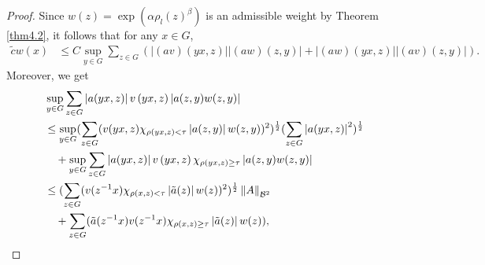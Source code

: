 \documentclass[preprint,11pt]{elsarticle}
\numberwithin{equation}{section}
\begin{document}
\begin{proof}
		\noindent Since $w(z)=\exp(\alpha \rho_{l }(z)^{\beta})$ is an admissible weight by Theorem \ref{thm4.2}, it follows that for any $x\in G$,
		\begin{align}
			\label{6.10}
			\tilde{c}w(x) &\le C\sup_{y\in G}\sum _{z\in G}(\left | (av)(yx,z) \right | \left | (aw) (z,y)\right |+\left | (aw)(yx,z) \right | \left | (av) (z,y)\right |).
		\end{align}
		Moreover, we get
		\begin{align}\label{norm}
			&\sup_{y\in G}\sum _{z\in G}\left | a(yx,z) \right | v\left ( yx,z \right )\left | a(z,y) w(z,y)\right |\notag\\
			&\leq\sup_{y\in G}(\sum _{z\in G}(v(yx,z)\chi _{\rho (yx,z)<\tau }\left | a(z,y) \right | w(z,y))^2 )^\frac{1}{2}  ( \sum _{z\in G} \left | a(yx,z) \right |^2 )^\frac{1}{2} \notag\\
			&\quad+\sup_{y\in G}\sum _{z\in G}\left | a(yx,z) \right | v\left ( yx,z \right  )\chi _{\rho (yx,z)\ge \tau}\left | a(z,y) w(z,y)\right |\notag\\
			&\le (\sum_{z\in G}( v(z^{-1}x)\chi_{\rho (x,z)<\tau}\left | \tilde a(z) \right |  w(z))^{2})^\frac{1}{2} \left \| A \right \|_{\mathcal{B}^{2} }\notag\\
			&\quad +\sum_{z\in G} (\tilde {a}(z^{-1}x) v(z^{-1}x)\chi_{\rho (x,z)\ge 
				\tau}\left | \tilde {a}(z) \right |  w(z)),
		\end{align}
		

\end{proof}
\end{document}
